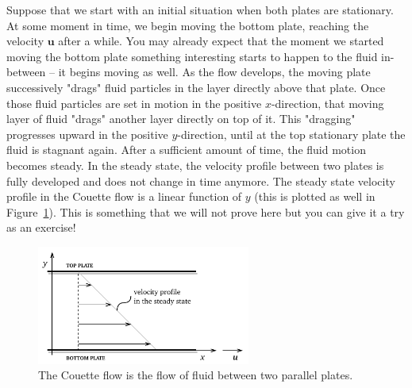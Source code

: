 \documentclass[10pt,twocolumn]{article}
\begin{document}
Suppose that we start with an initial situation when both plates are stationary. At some moment in time, we begin moving the bottom plate, reaching the velocity $\mathbf{u}$ after a while. You may already expect that the moment we started moving the bottom plate something interesting starts to happen to the fluid in-between -- it begins moving as well. As the flow develops, the moving plate successively "drags" fluid particles in the layer directly above that plate. Once those fluid particles are set in motion in the positive $x$-direction, that moving layer of fluid "drags" another layer directly on top of it. This "dragging" progresses upward in the positive $y$-direction, until at the top stationary plate the fluid is stagnant again. After a sufficient amount of time, the fluid motion becomes steady. In the steady state, the velocity profile between two plates is fully developed and does not change in time anymore. The steady state velocity profile in the Couette flow is a linear function of $y$ (this is plotted as well in Figure~\ref{fig:couette-flow}). This is something that we will not prove here but you can give it a try as an exercise!
\begin{figure}[H]
\centering\includegraphics[width=7cm]{couette-flow.pdf}
\caption{The Couette flow is the flow of fluid between two parallel plates.}
\label{fig:couette-flow}
\end{figure}
\end{document}
